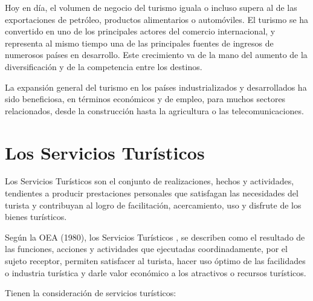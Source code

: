 Hoy en día, el volumen de negocio del turismo iguala o incluso supera al de las exportaciones de petróleo, productos alimentarios o automóviles. El turismo se ha convertido en uno de los principales actores del comercio internacional, y representa al mismo tiempo una de las principales fuentes de ingresos de numerosos países en desarrollo. Este crecimiento va de la mano del aumento de la diversificación y de la competencia entre los destinos.

La expansión general del turismo en los países industrializados y desarrollados ha sido beneficiosa, en términos económicos y de empleo, para muchos sectores relacionados, desde la construcción hasta la agricultura o las telecomunicaciones.





\section{Los Servicios Turísticos}



Los Servicios Turísticos son el conjunto de  realizaciones, hechos y actividades, tendientes a producir prestaciones personales que satisfagan las necesidades del turista y contribuyan al logro de facilitación, acercamiento, uso y disfrute de los bienes turísticos.

Según la OEA (1980), los Servicios Turísticos , se describen como el resultado de las funciones, acciones y actividades que ejecutadas coordinadamente, por el sujeto receptor, permiten satisfacer al turista, hacer uso óptimo de las facilidades o industria turística y darle valor económico a los atractivos o recursos turísticos.

Tienen la consideración de servicios turísticos:

